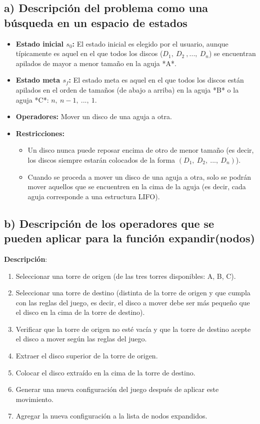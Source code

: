 \documentclass{article}
\begin{document}
\subsection*{a) Descripción del problema como una búsqueda en un espacio de estados}
\begin{itemize}
    \item \textbf{Estado inicial $s_0$:} El estado inicial es elegido por el usuario, aunque típicamente es aquel en el que todos los discos ($D_1, \: D_2 \: , ..., \: D_n$) se encuentran apilados de mayor a menor tamaño en la aguja *A*.
    
    \item \textbf{Estado meta $s_f$:} El estado meta es aquel en el que todos los discos están apilados en el orden de tamaños (de abajo a arriba) en la aguja *B* o la aguja *C*: $n, \: n-1, \: ..., \: 1$.
    
    \item \textbf{Operadores:} Mover un disco de una aguja a otra.
    
    \item \textbf{Restricciones:}
    \begin{itemize}
        \item Un disco nunca puede reposar encima de otro de menor tamaño (es decir, los discos siempre estarán colocados de la forma $(D_1, \: D_2, \: ..., \: D_n)$).
        \item Cuando se proceda a mover un disco de una aguja a otra, solo se podrán mover aquellos que se encuentren en la cima de la aguja (es decir, cada aguja corresponde a una estructura LIFO).
    \end{itemize}
\end{itemize}

\subsection*{b) Descripción de los operadores que se pueden aplicar para la función expandir(nodos)}
\textbf{Descripción}:
\begin{enumerate}
    \item Seleccionar una torre de origen (de las tres torres disponibles: A, B, C).
    \item Seleccionar una torre de destino (distinta de la torre de origen y que cumpla con las reglas del juego, es decir, el disco a mover debe ser más pequeño que el disco en la cima de la torre de destino).
    \item Verificar que la torre de origen no esté vacía y que la torre de destino acepte el disco a mover según las reglas del juego.
    \item Extraer el disco superior de la torre de origen.
    \item Colocar el disco extraído en la cima de la torre de destino.
    \item Generar una nueva configuración del juego después de aplicar este movimiento.
    \item Agregar la nueva configuración a la lista de nodos expandidos.
\end{enumerate}
\end{document}
